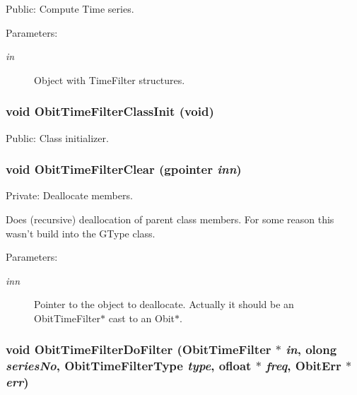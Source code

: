 Public: Compute Time series. 

\begin{Desc}
\item[Parameters:]
\begin{description}
\item[{\em in}]Object with Time\-Filter structures. \end{description}
\end{Desc}
\subsubsection{\setlength{\rightskip}{0pt plus 5cm}void Obit\-Time\-Filter\-Class\-Init (void)}\label{ObitTimeFilter_8c_a18}


Public: Class initializer. 

\subsubsection{\setlength{\rightskip}{0pt plus 5cm}void Obit\-Time\-Filter\-Clear (gpointer {\em inn})}\label{ObitTimeFilter_8c_a4}


Private: Deallocate members. 

Does (recursive) deallocation of parent class members. For some reason this wasn't build into the GType class. \begin{Desc}
\item[Parameters:]
\begin{description}
\item[{\em inn}]Pointer to the object to deallocate. Actually it should be an Obit\-Time\-Filter$\ast$ cast to an Obit$\ast$. \end{description}
\end{Desc}
\subsubsection{\setlength{\rightskip}{0pt plus 5cm}void Obit\-Time\-Filter\-Do\-Filter ({\bf Obit\-Time\-Filter} $\ast$ {\em in}, {\bf olong} {\em series\-No}, Obit\-Time\-Filter\-Type {\em type}, {\bf ofloat} $\ast$ {\em freq}, {\bf Obit\-Err} $\ast$ {\em err})}\label{ObitTimeFilter_8c_a15}


